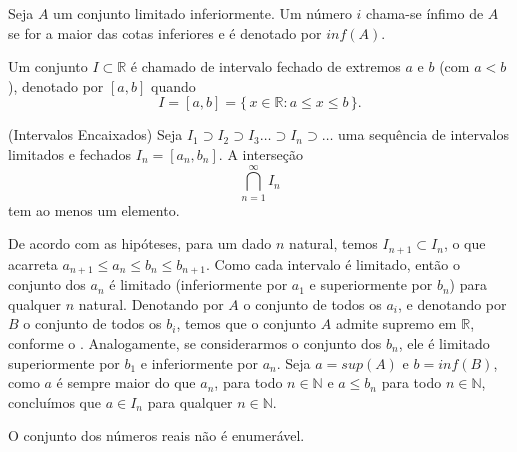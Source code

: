 \documentclass[../main.tex]{subfiles}
\begin{document}
\begin{defi}
    Seja $A$ um conjunto limitado inferiormente. Um número $i$ chama-se ínfimo de $A$ se for a maior das cotas inferiores e é denotado por $inf(A)$.
\end{defi}

\begin{defi}\label{enum-def-intervalos}
    Um conjunto $I \subset \mathbb{R}$ é chamado de intervalo fechado de extremos $a$ e $b$ (com $a<b$), denotado por $[a,b]$ quando 
    \[I = [a,b] = \{\,x \in \mathbb{R} : a \leq x \leq b \,\} .\]
\end{defi}

\begin{teo}{(Intervalos Encaixados)}\label{enum-teo-intervalosEncaixados}
    Seja $I_1 \supset I_2 \supset I_3 \dots \supset I_n \supset \dots$ uma sequência de intervalos limitados e fechados $I_n = [a_n, b_n]$.
    A interseção \[ \bigcap^\infty_{n=1} I_n \] tem ao menos um elemento.
\end{teo}
\begin{dem}
    De acordo com as hipóteses, para um dado $n$ natural, temos $I_{n+1} \subset I_n$, o que acarreta $a_{n+1} \leq a_n \leq b_n \leq b_{n+1}$. 
    Como cada intervalo é limitado, então o conjunto dos $a_n$ é limitado (inferiormente por $a_1$ e superiormente por $b_n$) para qualquer $n$ natural. Denotando por $A$ o conjunto de todos os $a_i$, e denotando por $B$ o conjunto de todos os $b_i$, temos que o conjunto $A$ admite supremo em $\mathbb{R}$, conforme o . Analogamente, se considerarmos o conjunto dos 
    $b_n$, ele é limitado superiormente por $b_1$ e inferiormente por $a_n$.
    Seja $a = sup(A)$ e $b = inf(B)$, como $a$ é sempre maior do que $a_n$, para todo $n \in \mathbb{N}$ e $a \leq b_n$ para todo $n \in \mathbb{N}$, concluímos que $a \in I_n$ para qualquer $n \in \mathbb{N}$.    
\end{dem}
\begin{teo}\label{enum-teo-RnaoEnumeravel}
    O conjunto dos números reais não é enumerável.
\end{teo}
\end{document}
